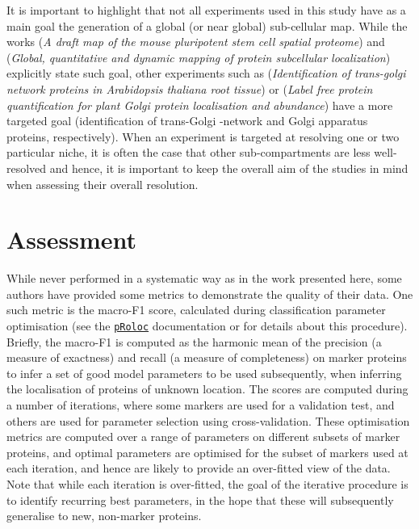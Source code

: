 \documentclass[12pt]{article}\usepackage[]{graphicx}\usepackage[]{color}
\newcommand{\Rpackage}[1]{\texttt{#1}}
\newcommand\Biocpkg[1]{%
  {\href{http://bioconductor.org/packages/#1}%
    {\Rpackage{#1}}}}
\begin{document}
It is important to highlight that not all experiments used in this
study have as a main goal the generation of a global (or near global)
sub-cellular map. While the works \citet{Christoforou:2016} (\textit{A
  draft map of the mouse pluripotent stem cell spatial proteome}) and
\citet{Itzhak:2016} (\textit{Global, quantitative and dynamic mapping
  of protein subcellular localization}) explicitly state such goal,
other experiments such as \citet{Groen:2014} (\textit{Identification
  of trans-golgi network proteins in Arabidopsis thaliana root
  tissue}) or \citet{Nikolovski:2014} (\textit{Label free protein
  quantification for plant Golgi protein localisation and abundance})
have a more targeted goal (identification of trans-Golgi -network and
Golgi apparatus proteins, respectively). When an experiment is
targeted at resolving one or two particular niche, it is often the
case that other sub-compartments are less well-resolved and hence, it
is important to keep the overall aim of the studies in mind when
assessing their overall resolution.

\section{Assessment}

While never performed in a systematic way as in the work presented
here, some authors have provided some metrics to demonstrate the
quality of their data. One such metric is the macro-F1 score,
calculated during classification parameter optimisation (see the
\Biocpkg{pRoloc} \cite{Gatto:2014a} documentation or \cite{Gatto:2014}
for details about this procedure). Briefly, the macro-F1 is computed
as the harmonic mean of the precision (a measure of exactness) and
recall (a measure of completeness) on marker proteins to infer a set
of good model parameters to be used subsequently, when inferring the
localisation of proteins of unknown location. The scores are computed
during a number of iterations, where some markers are used for a
validation test, and others are used for parameter selection using
cross-validation. These optimisation metrics are computed over a range
of parameters on different subsets of marker proteins, and optimal
parameters are optimised for the subset of markers used at each
iteration, and hence are likely to provide an over-fitted view of the
data. Note that while each iteration is over-fitted, the goal of the
iterative procedure is to identify recurring best parameters, in the
hope that these will subsequently generalise to new, non-marker
proteins.
\end{document}
